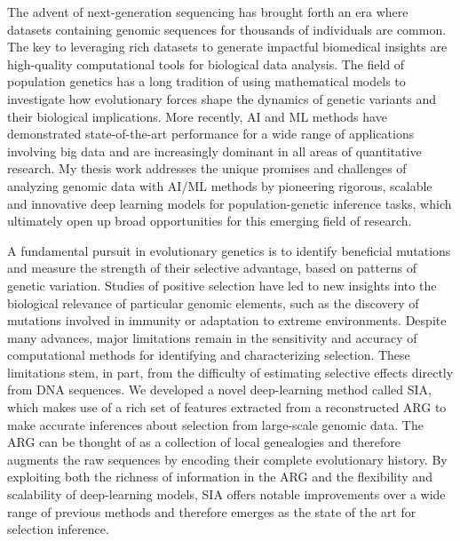 The advent of next-generation sequencing has brought forth an era where datasets containing genomic sequences for thousands of individuals are common. The key to leveraging rich datasets to generate impactful biomedical insights are high-quality computational tools for biological data analysis. The field of population genetics has a long tradition of using mathematical models to investigate how evolutionary forces shape the dynamics of genetic variants and their biological implications. More recently, \ac{AI} and \ac{ML} methods have demonstrated state-of-the-art performance for a wide range of applications involving big data and are increasingly dominant in all areas of quantitative research. My thesis work addresses the unique promises and challenges of analyzing genomic data with \ac{AI}/\ac{ML} methods by pioneering rigorous, scalable and innovative deep learning models for population-genetic inference tasks, which ultimately open up broad opportunities for this emerging field of research.

A fundamental pursuit in evolutionary genetics is to identify beneficial mutations and measure the strength of their selective advantage, based on patterns of genetic variation. Studies of positive selection have led to new insights into the biological relevance of particular genomic elements, such as the discovery of mutations involved in immunity or adaptation to extreme environments. Despite many advances, major limitations remain in the sensitivity and accuracy of computational methods for identifying and characterizing selection. These limitations stem, in part, from the difficulty of estimating selective effects directly from DNA sequences. We developed a novel deep-learning method called \ac{SIA}, which makes use of a rich set of features extracted from a reconstructed \ac{ARG} to make accurate inferences about selection from large-scale genomic data. The \ac{ARG} can be thought of as a collection of local genealogies and therefore augments the raw sequences by encoding their complete evolutionary history. By exploiting both the richness of information in the \ac{ARG} and the flexibility and scalability of deep-learning models, \ac{SIA} offers notable improvements over a wide range of previous methods and therefore emerges as the state of the art for selection inference.

